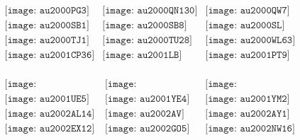 \documentclass{article}
\begin{document}
\begin{figure}[H]
 \begin{center}$
 \begin{array}{cccc}
\texttt{[image: au2000PG3]}&\texttt{[image: au2000QN130]}&\texttt{[image: au2000QW7]}\\\texttt{[image: au2000SB1]}&\texttt{[image: au2000SB8]}&\texttt{[image: au2000SL]}\\\texttt{[image: au2000TJ1]}&\texttt{[image: au2000TU28]}&\texttt{[image: au2000WL63]}\\\texttt{[image: au2001CP36]}&\texttt{[image: au2001LB]}&\texttt{[image: au2001PT9]}\\
\end{array}$
\end{center}
\end{figure}


        \clearpage
        \begin{figure}[H]
 \begin{center}$
 \begin{array}{cccc}
\texttt{[image: au2001QP181]}&\texttt{[image: au2001SG286]}&\texttt{[image: au2001SZ269]}\\\texttt{[image: au2001UE5]}&\texttt{[image: au2001YE4]}&\texttt{[image: au2001YM2]}\\\texttt{[image: au2002AL14]}&\texttt{[image: au2002AV]}&\texttt{[image: au2002AY1]}\\\texttt{[image: au2002EX12]}&\texttt{[image: au2002GO5]}&\texttt{[image: au2002NW16]}\\
\end{array}$
\end{center}
\end{figure}
\end{document}
